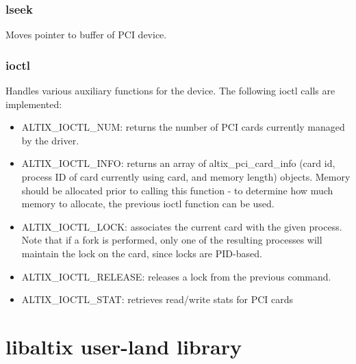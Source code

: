 \documentclass[12pt]{article}
\begin{document}
\subsubsection{lseek}
Moves pointer to buffer of PCI device.

\subsubsection{ioctl}
Handles various auxiliary functions for the device.  The following ioctl calls are implemented:

\begin{itemize}
\item ALTIX\_IOCTL\_NUM: returns the number of PCI cards currently managed by the driver.
\item ALTIX\_IOCTL\_INFO: returns an array of altix\_pci\_card\_info (card id, process ID of card currently using card, and memory length) objects.  Memory should be allocated prior to calling this function - to determine how much memory to allocate, the previous ioctl function can be used.
\item ALTIX\_IOCTL\_LOCK: associates the current card with the given process.  Note that if a fork is performed, only one of the resulting processes will maintain the lock on the card, since locks are PID-based.
\item ALTIX\_IOCTL\_RELEASE: releases a lock from the previous command.
\item ALTIX\_IOCTL\_STAT: retrieves read/write stats for PCI cards
\end{itemize}


\section{libaltix user-land library}
\end{document}
